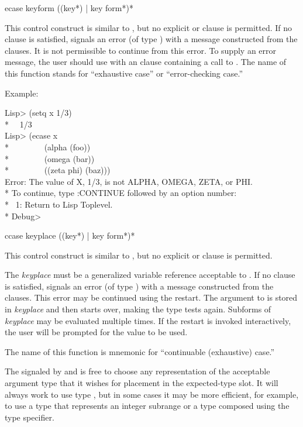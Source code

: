 \begin{defmac}
ecase keyform {({({key}*) | key} {form}*)}*

This control construct is similar to , but no explicit 
or  clause is permitted. If no clause is satisfied,  signals
an error (of type ) with a message constructed from the
clauses. It is not permissible to continue from this error. To supply an error
message, the user should use  with an  clause
containing a call to .  The name of this function stands for
``exhaustive case'' or ``error-checking case.''

Example:
\begin{lisp}
Lisp> (setq x 1/3) \\*
~\EV\ 1/3 \\
Lisp> (ecase x \\*
~~~~~~~~(alpha (foo)) \\*
~~~~~~~~(omega (bar)) \\*
~~~~~~~~((zeta phi) (baz))) \\
Error: The value of X, 1/3, is not ALPHA, OMEGA, ZETA, or PHI. \\*
To continue, type :CONTINUE followed by an option number: \\*
~1: Return to Lisp Toplevel. \\*
Debug>
\end{lisp}
\end{defmac}

\begin{defmac}
ccase keyplace {({({key}*) | key} {form}*)}*

This control construct is similar to , but no explicit 
or  clause is permitted.

The \emph{keyplace} must be a generalized variable reference acceptable to
.  If no clause is satisfied,  signals an error (of type
) with a message constructed from the clauses. This error may be
continued using the  restart. The argument to 
is stored in \emph{keyplace} and then  starts over, making the type
tests again. Subforms of \emph{keyplace} may be evaluated multiple times. If the
 restart is invoked interactively, the user will be prompted
for the value to be used.

The name of this function is mnemonic for ``continuable (exhaustive) case.''

\beforenoterule
\begin{implementation}
  The  signaled by  and  is free to
  choose any representation of the acceptable argument type that it wishes
  for placement in the expected-type slot. It will always work to use type
  , but in some cases it may be more efficient, for example,
  to use a type that represents an integer subrange or a type composed using the
   type specifier.
\end{implementation}
\afternoterule
\end{defmac}

